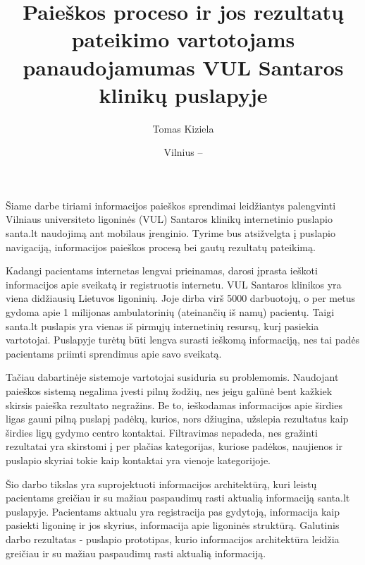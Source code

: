 \documentclass{VUMIFPSkursinis}
\title{Paieškos proceso ir jos rezultatų pateikimo vartotojams panaudojamumas VUL Santaros klinikų puslapyje}
\author{Tomas Kiziela}
\date{Vilnius – \the\year}
\begin{document}
	
\maketitle
\cleardoublepage{}
\setcounter{page}{2}

\tableofcontents

Šiame darbe tiriami informacijos paieškos sprendimai leidžiantys palengvinti Vilniaus universiteto ligoninės (VUL) Santaros klinikų internetinio puslapio santa.lt naudojimą ant mobilaus įrenginio. Tyrime bus atsižvelgta į puslapio navigaciją, informacijos paieškos procesą bei gautų rezultatų pateikimą.

Kadangi pacientams internetas lengvai prieinamas, darosi įprasta ieškoti informacijos apie sveikatą ir registruotis internetu\cite{InternetUseByPublicSAEn}\cite{InternetUseByPublicHKEn}. VUL Santaros klinikos yra viena didžiausių Lietuvos ligoninių. Joje dirba virš 5000 darbuotojų, o per metus gydoma apie 1 milijonas ambulatorinių (ateinančių iš namų) pacientų\cite{VulSkApieMusLt}. Taigi santa.lt puslapis yra vienas iš pirmųjų internetinių resursų, kurį pasiekia vartotojai. Puslapyje turėtų būti lengva surasti ieškomą informaciją, nes tai padės pacientams priimti sprendimus apie savo sveikatą.

Tačiau dabartinėje sistemoje vartotojai susiduria su problemomis. Naudojant paieškos sistemą negalima įvesti pilnų žodžių, nes jeigu galūnė bent kažkiek skirsis paieška rezultato negražins. Be to, ieškodamas informacijos apie širdies ligas gauni pilną puslapį padėkų, kurios, nors džiugina, užslepia rezultatus kaip širdies ligų gydymo centro kontaktai. Filtravimas nepadeda, nes gražinti rezultatai yra skirstomi į per plačias kategorijas, kuriose padėkos, naujienos ir puslapio skyriai tokie kaip kontaktai yra vienoje kategorijoje. 

Šio darbo tikslas yra suprojektuoti informacijos architektūrą, kuri leistų pacientams greičiau ir su mažiau paspaudimų rasti aktualią informaciją santa.lt puslapyje. Pacientams aktualu yra registracija pas gydytoją, informacija kaip pasiekti ligoninę ir jos skyrius, informacija apie ligoninės struktūrą. Galutinis darbo rezultatas - puslapio prototipas, kurio informacijos architektūra leidžia greičiau ir su mažiau paspaudimų rasti aktualią informaciją.
\end{document}
